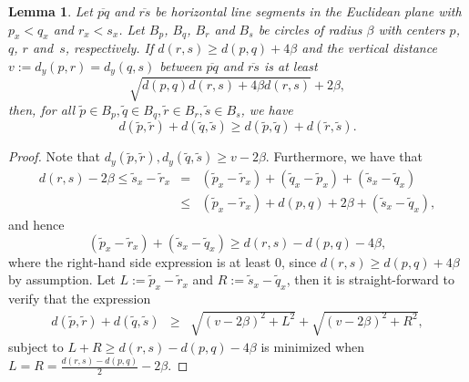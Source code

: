 \documentclass[11pt,DIV=12,a4paper]{scrartcl}
\newtheorem{lemma}[claim]{Lemma}
\begin{document}
\begin{lemma}\label{lem:horiz}
Let $\overline{pq}$ and $\overline{rs}$ be horizontal line segments in the Euclidean plane with $p_x < q_x$ and $r_x < s_x$. Let $B_p$, $B_q$, $B_r$ and $B_s$ be circles of radius $\beta$ with centers $p$, $q$, $r$ and~$s$, respectively. If $d(r,s) \ge d(p,q) + 4\beta$ and the vertical distance $v:=d_y(p,r) = d_y(q,s)$ between $\overline{pq}$ and $\overline{rs}$ is at least
\[ \sqrt{d(p,q)d(r,s) + 4\beta d(r,s)} + 2\beta, \] 
then, for all $\tilde{p}\in B_p, \tilde{q} \in B_q, \tilde{r}\in B_r,\tilde{s}\in B_s$, we have
\[ d(\tilde{p},\tilde{r}) + d(\tilde{q},\tilde{s}) \ge d(\tilde{p},\tilde{q}) + d(\tilde{r},\tilde{s}). \]
\end{lemma}
\begin{proof}
Note that $d_y(\tilde{p},\tilde{r}), d_y(\tilde{q},\tilde{s}) \ge v - 2\beta$. Furthermore, we have that 
\begin{eqnarray*}
d(r,s)-2\beta \le \tilde{s}_x - \tilde{r}_x & = & (\tilde{p}_x - \tilde{r}_x) + (\tilde{q}_x-\tilde{p}_x) + (\tilde{s}_x - \tilde{q}_x) \\
& \le & (\tilde{p}_x - \tilde{r}_x) + d(p,q) + 2\beta + (\tilde{s}_x - \tilde{q}_x),
\end{eqnarray*}
and hence
\[ (\tilde{p}_x - \tilde{r}_x) + (\tilde{s}_x -\tilde{q}_x) \ge   d(r,s) - d(p,q) - 4\beta ,\]
where the right-hand side expression is at least $0$, since $d(r,s)\ge d(p,q) + 4\beta$ by assumption. Let $L := \tilde{p}_x - \tilde{r}_x$ and $R:=\tilde{s}_x -\tilde{q}_x$, then it is straight-forward to verify that the expression
\begin{eqnarray}
d(\tilde{p},\tilde{r}) + d(\tilde{q},\tilde{s}) &  \ge & \sqrt{(v-2\beta)^2 + L^2} + \sqrt{(v-2\beta)^2 + R^2} \label{eq:cross},
\end{eqnarray}
subject to $L+R \ge d(r,s)-d(p,q) - 4\beta$ is minimized when $L=R=\frac{d(r,s)-d(p,q)}{2}-2\beta$.


\end{proof}
\end{document}
